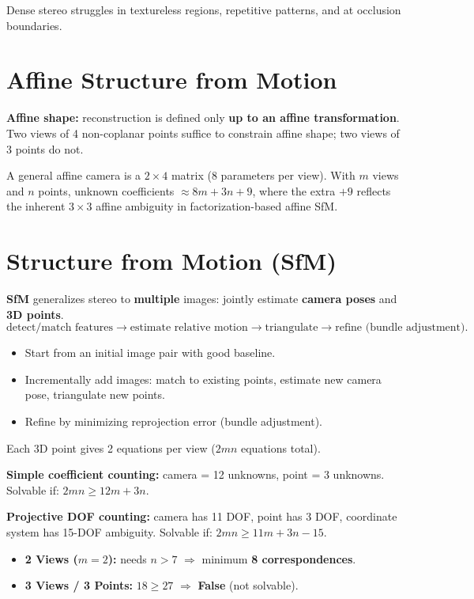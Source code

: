 \documentclass[11pt, oneside]{book}
\begin{document}
Dense stereo struggles in textureless regions, repetitive patterns, and at occlusion boundaries.

\section{Affine Structure from Motion}

\textbf{Affine shape:} reconstruction is defined only \textbf{up to an affine transformation}.
Two views of 4 non-coplanar points suffice to constrain affine shape; two views of 3 points do not.

A general affine camera is a $2\times4$ matrix (8 parameters per view).
With $m$ views and $n$ points, unknown coefficients $\approx 8m + 3n + 9$,
where the extra $+9$ reflects the inherent $3\times3$ affine ambiguity in factorization-based affine SfM.

\section{Structure from Motion (SfM)}

\begin{defbox}[title={SfM Pipeline}]
\textbf{SfM} generalizes stereo to \textbf{multiple} images: jointly estimate \textbf{camera poses} and \textbf{3D points}.
\[
\text{detect/match features} \rightarrow \text{estimate relative motion} \rightarrow \text{triangulate} \rightarrow \text{refine (bundle adjustment)}.
\]
\end{defbox}

\begin{itemize}
  \item Start from an initial image pair with good baseline.
  \item Incrementally add images: match to existing points, estimate new camera pose, triangulate new points.
  \item Refine by minimizing reprojection error (bundle adjustment).
\end{itemize}

\begin{notebox}[title={SfM Equation Counting ($m$ views, $n$ points)}]
Each 3D point gives 2 equations per view ($2mn$ equations total).

\textbf{Simple coefficient counting:} camera = 12 unknowns, point = 3 unknowns.
Solvable if: $2mn \ge 12m + 3n$.

\textbf{Projective DOF counting:} camera has 11 DOF, point has 3 DOF, coordinate system has 15-DOF ambiguity.
Solvable if: $2mn \ge 11m + 3n - 15$.
\begin{itemize}
  \item \textbf{2 Views ($m=2$):} needs $n > 7$ $\Rightarrow$ minimum \textbf{8 correspondences}.
  \item \textbf{3 Views / 3 Points:} $18 \ge 27$ $\Rightarrow$ \textbf{False} (not solvable).
\end{itemize}
\end{notebox}
\end{document}
